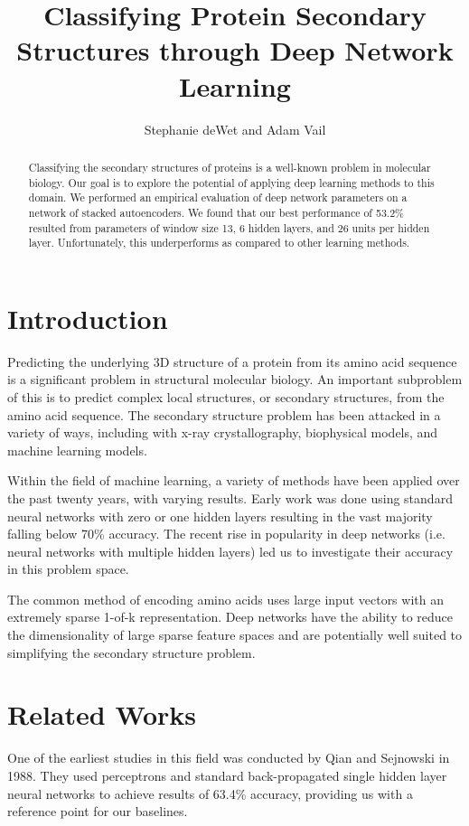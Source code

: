 \documentclass[letterpaper,twocolumn,12pt]{article}
\title{Classifying Protein Secondary Structures through Deep Network Learning}
\author{Stephanie deWet and Adam Vail}
\begin{document}
\maketitle

\begin{abstract}
Classifying the secondary structures of proteins is a well-known problem in molecular biology.
Our goal is to explore the potential of applying deep learning methods to this domain.
We performed an empirical evaluation of deep network parameters on a network of stacked autoencoders.
We found that our best performance of 53.2\% resulted from parameters of window size 13, 6 hidden layers, and 26 units per hidden layer.
Unfortunately, this underperforms as compared to other learning methods.
\end{abstract}

\section{Introduction}
\label{subsec:intro}
Predicting the underlying 3D structure of a protein from its amino acid sequence is a significant problem in structural molecular biology.
An important subproblem of this is to predict complex local structures, or secondary structures, from the amino acid sequence.  
The secondary structure problem has been attacked in a variety of ways, including with x-ray crystallography, biophysical models, and machine learning models.

Within the field of machine learning, a variety of methods have been applied over the past twenty years, with varying results. 
Early work was done using standard neural networks with zero or one hidden layers resulting in the vast majority falling below 70\% accuracy.
The recent rise in popularity in deep networks (i.e. neural networks with multiple hidden layers) led us to investigate their accuracy in this problem space.

The common method of encoding amino acids uses large input vectors with an extremely sparse 1-of-k representation.
Deep networks have the ability to reduce the dimensionality of large sparse feature spaces and are potentially well suited to simplifying the secondary structure problem.

\section{Related Works}
\label{subsec:relatedworks}
One of the earliest studies in this field was conducted by Qian and Sejnowski \cite{Qian} in 1988.
They used perceptrons and standard back-propagated single hidden layer neural networks to achieve results of 63.4\% accuracy, providing us with a reference point for our baselines.
\end{document}
